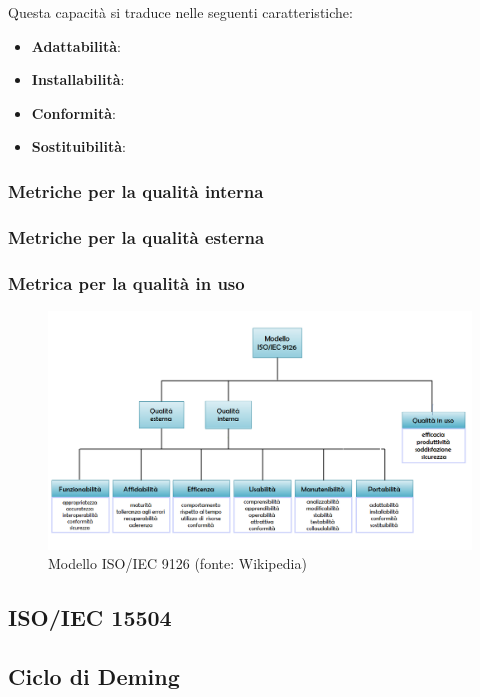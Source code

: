 	Questa capacità si traduce nelle seguenti caratteristiche:
	\begin{itemize}
		\item{\textbf{Adattabilità}:}
		\item{\textbf{Installabilità}:}
		\item{\textbf{Conformità}:}
		\item{\textbf{Sostituibilità}:}
	\end{itemize}
	
	\subsubsection{Metriche per la qualità interna}
	
	\subsubsection{Metriche per la qualità esterna}
	
	\subsubsection{Metrica per la qualità in uso}

	\begin{figure}[H]
		\centering
		\includegraphics[scale=0.5]{./res/img/ISO_IEC_9126.png}
		\caption[Modello ISO/IEC 9126]{Modello ISO/IEC 9126 (fonte: Wikipedia)}
	\end{figure}

\subsection{ISO/IEC 15504}

\subsection{Ciclo di Deming}